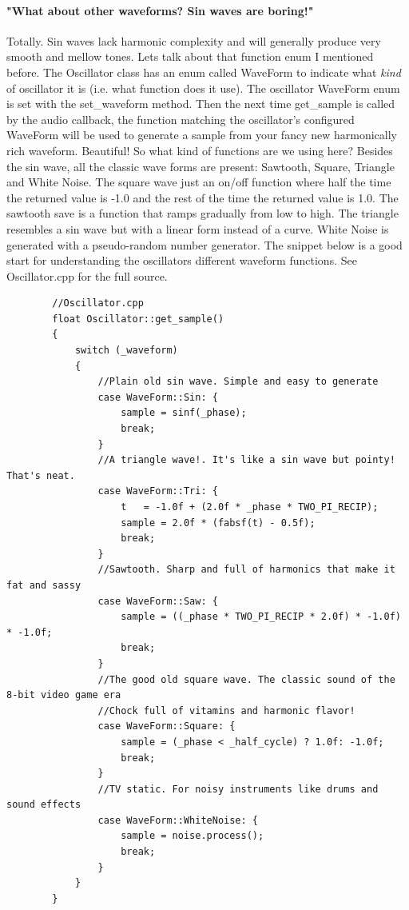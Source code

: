 \documentclass[acmlarge,screen]{acmart}
\begin{document}
	\paragraph{"What about other waveforms? Sin waves are boring!"} Totally. Sin waves lack harmonic complexity and will generally produce very smooth and mellow tones. Lets talk about that function enum I mentioned before. The Oscillator class has an enum called WaveForm to indicate what \textit{kind} of oscillator it is (i.e. what function does it use). The oscillator WaveForm enum is set with the set\_waveform method. Then the next time get\_sample is called by the audio callback, the function matching the oscillator's configured WaveForm will be used to generate a sample from your fancy new harmonically rich waveform. \cite{downey_2016} Beautiful! So what kind of functions are we using here? Besides the sin wave, all the classic wave forms are present: Sawtooth, Square, Triangle and White Noise. The square wave just an on/off function where half the time the returned value is -1.0 and the rest of the time the returned value is 1.0. The sawtooth save is a function that ramps gradually from low to high. The triangle resembles a sin wave but with a linear form instead of a curve. White Noise is generated with a pseudo-random number generator. \cite{tagi_2019} The snippet below is a good start for understanding the oscillators different waveform functions. See Oscillator.cpp for the full source.
	
	
	\begin{verbatim}
		//Oscillator.cpp
		float Oscillator::get_sample()
		{
			switch (_waveform)
			{
				//Plain old sin wave. Simple and easy to generate
				case WaveForm::Sin: {
					sample = sinf(_phase);
					break;
				}
				//A triangle wave!. It's like a sin wave but pointy! That's neat.
				case WaveForm::Tri: {
					t   = -1.0f + (2.0f * _phase * TWO_PI_RECIP);
					sample = 2.0f * (fabsf(t) - 0.5f);
					break;
				}
				//Sawtooth. Sharp and full of harmonics that make it fat and sassy
				case WaveForm::Saw: {
					sample = ((_phase * TWO_PI_RECIP * 2.0f) * -1.0f) * -1.0f;
					break;
				}
				//The good old square wave. The classic sound of the 8-bit video game era
				//Chock full of vitamins and harmonic flavor!
				case WaveForm::Square: {
					sample = (_phase < _half_cycle) ? 1.0f: -1.0f;
					break;
				}
				//TV static. For noisy instruments like drums and sound effects
				case WaveForm::WhiteNoise: {
					sample = noise.process();
					break;
				}
			}
		}
	\end{verbatim}
\end{document}
